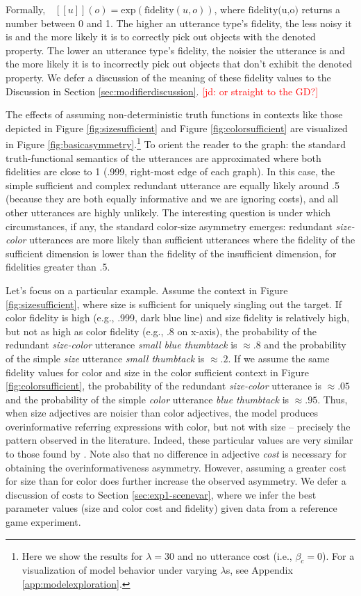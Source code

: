 \documentclass[11pt]{article}
\newcommand{\jd}[1]{\textcolor{Red}{[jd: #1]}}
\newcommand{\denote}[1]{\mbox{ $[\![ #1 ]\!]$}}
\newcommand{\figref}[1]{Figure \ref{#1}}
\newcommand{\appref}[1]{Appendix \ref{#1}}
\newcommand{\sectionref}[1]{Section \ref{#1}}
\begin{document}
Formally, $\denote{u}(o) = \textrm{exp}(\textrm{fidelity}(u,o))$, where $\textrm{fidelity(u,o)}$ returns a number between 0 and 1. The higher an utterance type's fidelity, the less noisy it is and the more likely it is to correctly pick out objects with the denoted property. The lower an utterance type's fidelity, the noisier the utterance is and the more likely it is to incorrectly pick out objects that don't exhibit the denoted property. We defer a discussion of the meaning of these fidelity values to the Discussion in \sectionref{sec:modifierdiscussion}. \jd{or straight to the GD?}

The effects of assuming non-deterministic truth functions in contexts like those depicted in \figref{fig:sizesufficient} and \figref{fig:colorsufficient} are visualized in \figref{fig:basicasymmetry}.\footnote{Here we show the results for $\lambda = 30$  and no utterance cost (i.e., $\beta_c = 0$). For a visualization of model behavior under varying $\lambda$s, see \appref{app:modelexploration}.} To orient the reader to the graph: the standard truth-functional semantics of the utterances are approximated where both fidelities are close to 1 (.999, right-most edge of each graph). In this case, the simple sufficient and complex redundant utterance are equally likely around .5 (because they are both equally informative and we are ignoring costs), and all other utterances are highly unlikely. The interesting question is under which circumstances, if any,  the standard color-size asymmetry emerges: redundant \emph{size-color} utterances are more likely than sufficient utterances where the fidelity of the sufficient dimension is lower than the fidelity of the insufficient dimension, for fidelities greater than .5. 

Let's focus on a particular example. Assume the context in \figref{fig:sizesufficient}, where size is sufficient for uniquely singling out the target. If color fidelity is high (e.g., .999, dark blue line) and size fidelity is relatively high, but not as high as color fidelity (e.g., .8 on x-axis), the probability of the redundant \emph{size-color} utterance \emph{small blue thumbtack} is $\approx .8$ and the probability of the simple \emph{size} utterance \emph{small thumbtack} is $\approx .2$. If we assume the same fidelity values for color and size in the color sufficient context in \figref{fig:colorsufficient}, the probability of the redundant \emph{size-color} utterance is $\approx .05$ and the probability of the simple \emph{color} utterance \emph{blue thumbtack} is $\approx .95$. Thus, when size adjectives are noisier than color adjectives, the model produces overinformative referring expressions with color, but not with size -- precisely the pattern observed in the literature. Indeed, these particular values are very similar to those found by . Note also that no difference in adjective \emph{cost} is necessary for obtaining the overinformativeness asymmetry. However, assuming a greater cost for size than for color does further increase the observed asymmetry. We defer a discussion of costs to \sectionref{sec:exp1-scenevar}, where we infer the best parameter values (size and color cost and fidelity) given data from a reference game experiment.
\end{document}
